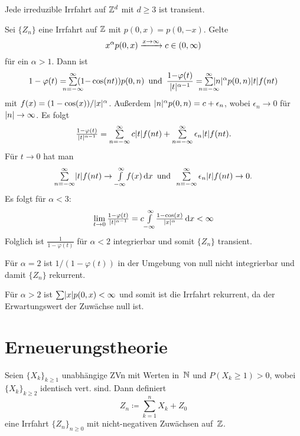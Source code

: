 \documentclass{cheat-sheet}
\begin{document}
\begin{satz}
  Jede irreduzible Irrfahrt auf $\mathbb{Z}^d$ mit $d \geq 3$ ist transient.
\end{satz}

\begin{bsp}
  Sei $\{ Z_n \}$ eine Irrfahrt auf $\mathbb{Z}$ mit $p(0, x) = p(0, -x)$.
  Gelte
  \[ x^\alpha p(0, x) \xrightarrow{x \to \infty} c \in \left( 0, \infty \right) \]
  für ein $\alpha > 1$.
  Dann ist
  \[
    1 - \varphi(t) = \sum_{\mathclap{n=-\infty}}^\infty (1{-}\cos(nt)) p(0, n)
    \enspace \text{und} \enspace
    \frac{1 {-} \varphi(t)}{\abs{t}^{\alpha - 1}} = \sum_{\mathclap{n=-\infty}}^\infty \abs{n}^\alpha p(0, n) \abs{t} f(n t)
  \]
  mit $f(x) = (1 - \cos(x))/\lvert x\rvert^\alpha$.
  Außerdem $\lvert n\rvert^\alpha p(0, n) = c + \epsilon_n$, wobei $\epsilon_n \to 0$ für $\lvert n\rvert \to \infty$.
  Es folgt
  \[
    \tfrac{1 - \varphi(t)}{\abs{t}^{\alpha - 1}} = \sum_{n=-\infty}^\infty c \abs{t} f(n t) + \sum_{n=-\infty}^\infty \epsilon_n \abs{t} f(n t).
  \]
  Für $t \to 0$ hat man
  \[
    \sum_{n=-\infty}^\infty \abs{t} f(n t) \to \Int{-\infty}{\infty}{f(x)}{x}
    \enspace \text{und} \enspace
    \sum_{n=-\infty}^\infty \epsilon_n \abs{t} f(n t) \to 0.
  \]
  Es folgt für $\alpha < 3$:
  \[ \lim_{t \to 0} \tfrac{1 - \varphi(t)}{\lvert t\rvert^{\alpha - 1}} = c {\textstyle \int\limits_{-\infty}^{\infty}} \tfrac{1 - \cos(x)}{\lvert x\rvert^\alpha} \,\mathrm{d} x < \infty \]
  Folglich ist $\tfrac{1}{1 - \varphi(t)}$ für $\alpha < 2$ integrierbar und somit $\{ Z_n \}$ transient.

  Für $\alpha = 2$ ist $1/(1 - \varphi(t))$ in der Umgebung von null nicht integrierbar und damit $\{ Z_n \}$ rekurrent.

  Für $\alpha > 2$ ist $\sum \abs{x} p(0, x) < \infty$ und somit ist die Irrfahrt rekurrent, da der Erwartungswert der Zuwächse null ist.
\end{bsp}


\section{Erneuerungstheorie}

\begin{situation}
  Seien $\{ X_k \}_{k \geq 1}$ unabhängige ZVn mit Werten in~$\mathbb{N}$ und $P(X_k \geq 1) > 0$, wobei $\{ X_k \}_{k \geq 2}$ identisch vert. sind.
  Dann definiert
  \[
  Z_n \coloneqq {\sum}_{k=1}^n X_k + Z_0
  \]
  eine Irrfahrt $\{ Z_n \}_{n \geq 0}$ mit nicht-negativen Zuwächsen auf~$\mathbb{Z}$.
\end{situation}
\end{document}
